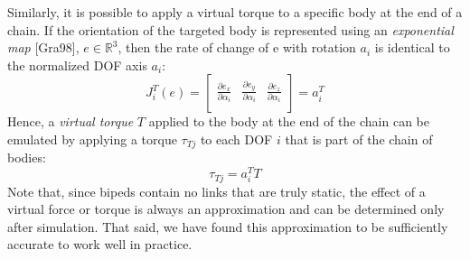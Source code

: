 \documentclass[runningheads,a4paper,10pt]{llncs}
\begin{document}
Similarly, it is possible to apply a virtual torque to a specific body at the end of a chain. If the orientation of the targeted body is represented using an \textit{exponential map} [Gra98], $e \in  \mathbb{R} ^3$, then the rate of change of e with rotation $a_i$ is identical to the normalized DOF axis $a_i$:
\begin{equation}
J_i ^T (e)=\begin{bmatrix}
\frac{\partial e_x}{\partial \alpha_i} & \frac{\partial e_y}{\partial \alpha_i} & \frac{\partial e_z}{\partial \alpha_i} \\
\end{bmatrix}
= a^T_i 
\end{equation}
Hence, a \textit{virtual torque} $T$ applied to the body at the end of the chain can be emulated by applying a torque $\tau _{Tj}$ to each DOF $i$ that is part of the chain of bodies:
\begin{equation}
\tau _{Tj}= a^T_i T
\end{equation}
Note that, since bipeds contain no links that are truly static, the effect of a virtual force or torque is always an approximation and can be determined only after simulation. That said, we have found this approximation to be sufficiently accurate to work well in practice.
\end{document}
